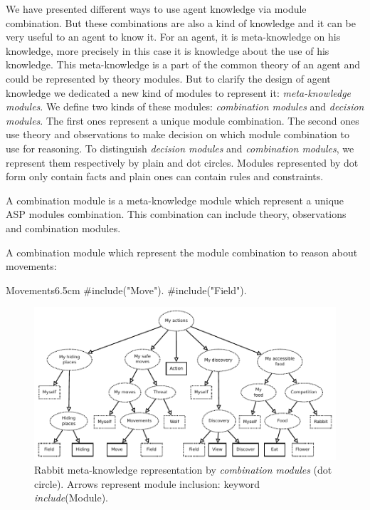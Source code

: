 \documentclass{aamas2012}
\begin{document}
	We have presented different ways to use agent knowledge via module combination.
	But these combinations are also a kind of knowledge and it can be very useful to an agent to know it.
	For an agent, it is meta-knowledge on his knowledge, more precisely in this case it is knowledge about the use of his knowledge.
	This meta-knowledge is a part of the common theory of an agent and could be represented by theory modules.
	But to clarify the design of agent knowledge we dedicated a new kind of modules to represent it: \emph{meta-knowledge modules}.
	We define two kinds of these modules: \emph{combination modules} and \emph{decision modules}.
	The first ones represent a unique module combination.
	The second ones use theory and observations to make decision on which module combination to use for reasoning.
	To distinguish \emph{decision modules} and \emph{combination modules}, we represent them respectively by plain and dot circles.
	Modules represented by dot form only contain facts and plain ones can contain rules and constraints.
	
	\begin{definition}
		A combination module is a meta-knowledge module which represent a unique ASP modules combination.
		This combination can include theory, observations and combination modules.
	\end{definition}
	
	\begin{example}
		\label{movement_example}
		A combination module which represent the module combination to reason about movements:
		\begin{module}{Movements}{6.5cm}
			\#include("Move").\newline
			\#include("Field").
		\end{module}
	\end{example}
	
	\begin{figure}
		\centering
		\includegraphics[keepaspectratio=true, scale=1]{meta-knowledge.pdf}
		\caption
		{
			\label{meta-knowledge}
			Rabbit meta-knowledge representation by \emph{combination modules} (dot circle).
			Arrows represent module inclusion: keyword \emph{include}(Module).
		}
	\end{figure}
	
\end{document}
